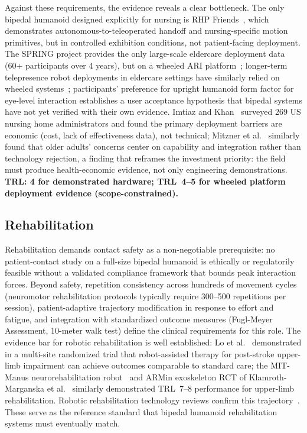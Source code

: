 \documentclass[acmjour]{acmart}
\begin{document}
Against these requirements, the evidence reveals a clear bottleneck. The only
bipedal humanoid designed explicitly for nursing is RHP
Friends~\cite{benallegue2025rhp}, which demonstrates autonomous-to-teleoperated
handoff and nursing-specific motion primitives, but in controlled exhibition
conditions, not patient-facing deployment. The SPRING project provides the only
large-scale eldercare deployment data (60+ participants over 4 years), but on a
wheeled ARI platform~\cite{alamedapineda2024spring}; longer-term telepresence
robot deployments in eldercare settings have similarly relied on wheeled
systems~\cite{cesta2016amicare}; participants' preference for
upright humanoid form factor for eye-level interaction establishes a user
acceptance hypothesis that bipedal systems have not yet verified with their own
evidence. Imtiaz and Khan~\cite{imtiaz2024perceptions} surveyed 269 US nursing
home administrators and found the primary deployment barriers are economic
(cost, lack of effectiveness data), not technical; Mitzner et
al.~\cite{mitzner2018technology} similarly found that older adults' concerns
center on capability and integration rather than technology rejection, a finding
that reframes the investment priority: the field must produce health-economic evidence, not only
engineering demonstrations. \textbf{TRL: 4 for demonstrated hardware;
TRL~4--5 for wheeled platform deployment evidence (scope-constrained).}

\subsection{Rehabilitation}
\label{sec:rehabilitation}

Rehabilitation demands contact safety as a non-negotiable prerequisite: no
patient-contact study on a full-size bipedal humanoid is ethically or
regulatorily feasible without a validated compliance framework that bounds peak
interaction forces. Beyond safety, repetition consistency across hundreds of
movement cycles (neuromotor rehabilitation protocols typically require 300--500
repetitions per session), patient-adaptive trajectory modification in response to
effort and fatigue, and integration with standardized outcome measures
(Fugl-Meyer Assessment, 10-meter walk test) define the clinical requirements for
this role. The evidence bar for robotic rehabilitation is well established:
Lo et al.~\cite{lo2010robot} demonstrated in a multi-site randomized trial that
robot-assisted therapy for post-stroke upper-limb impairment can achieve
outcomes comparable to standard care; the MIT-Manus neurorehabilitation
robot~\cite{krebs1998robot} and ARMin exoskeleton RCT of
Klamroth-Marganska et al.~\cite{klamroth2014armin} similarly demonstrated
TRL~7--8 performance for upper-limb rehabilitation. Robotic rehabilitation
technology reviews confirm this trajectory~\cite{poli2013robotic}. These serve
as the reference standard that bipedal humanoid rehabilitation systems must
eventually match.
\end{document}
